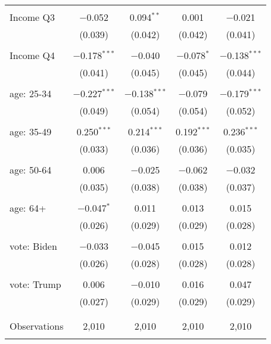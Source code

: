 \begin{tabular}{@{\extracolsep{5pt}}lcccc}
  & & & & \\ 
 Income Q3 & $-$0.052 & 0.094$^{**}$ & 0.001 & $-$0.021 \\ 
  & (0.039) & (0.042) & (0.042) & (0.041) \\ 
  & & & & \\ 
 Income Q4 & $-$0.178$^{***}$ & $-$0.040 & $-$0.078$^{*}$ & $-$0.138$^{***}$ \\ 
  & (0.041) & (0.045) & (0.045) & (0.044) \\ 
  & & & & \\ 
 age: 25-34 & $-$0.227$^{***}$ & $-$0.138$^{***}$ & $-$0.079 & $-$0.179$^{***}$ \\ 
  & (0.049) & (0.054) & (0.054) & (0.052) \\ 
  & & & & \\ 
 age: 35-49 & 0.250$^{***}$ & 0.214$^{***}$ & 0.192$^{***}$ & 0.236$^{***}$ \\ 
  & (0.033) & (0.036) & (0.036) & (0.035) \\ 
  & & & & \\ 
 age: 50-64 & 0.006 & $-$0.025 & $-$0.062 & $-$0.032 \\ 
  & (0.035) & (0.038) & (0.038) & (0.037) \\ 
  & & & & \\ 
 age: 64+ & $-$0.047$^{*}$ & 0.011 & 0.013 & 0.015 \\ 
  & (0.026) & (0.029) & (0.029) & (0.028) \\ 
  & & & & \\ 
 vote: Biden & $-$0.033 & $-$0.045 & 0.015 & 0.012 \\ 
  & (0.026) & (0.028) & (0.028) & (0.028) \\ 
  & & & & \\ 
 vote: Trump & 0.006 & $-$0.010 & 0.016 & 0.047 \\ 
  & (0.027) & (0.029) & (0.029) & (0.029) \\ 
  & & & & \\ 
\hline \\[-1.8ex] 

Observations & 2,010 & 2,010 & 2,010 & 2,010 \\ 
\hline 
\hline \\[-1.8ex] 
\end{tabular} 